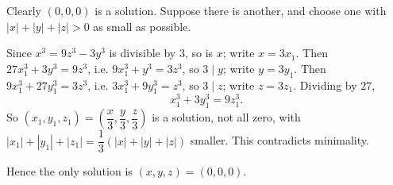 Clearly $(0,0,0)$ is a solution. Suppose there is another, and choose one with $|x|+|y|+|z|>0$ as small as possible.

Since $x^3=9z^3-3y^3$ is divisible by $3$, so is $x$; write $x=3x_1$. Then $27x_1^3+3y^3=9z^3$, i.e. $9x_1^3+y^3=3z^3$, so $3\mid y$; write $y=3y_1$. Then $9x_1^3+27y_1^3=3z^3$, i.e. $3x_1^3+9y_1^3=z^3$, so $3\mid z$; write $z=3z_1$. Dividing by $27$,
\[x_1^3+3y_1^3=9z_1^3.\]
So $(x_1,y_1,z_1)=\left(\dfrac x3,\dfrac y3,\dfrac z3\right)$ is a solution, not all zero, with $|x_1|+|y_1|+|z_1|=\dfrac13\left(|x|+|y|+|z|\right)$ smaller. This contradicts minimality.

Hence the only solution is $\boxed{(x,y,z)=(0,0,0)}$.
